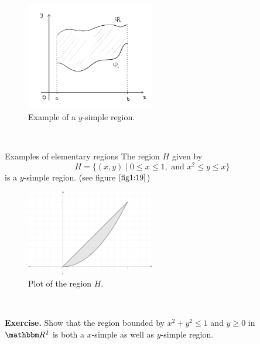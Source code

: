 \documentclass[Analysis-3.tex]{subfiles}
\begin{document}
\begin{figure}[H]
    \centering
    \includegraphics[width=0.5\textwidth]{figures/ysimpleRegion.png}
    \caption{Example of a $y$-simple region.}
\end{figure}

\

\begin{Eg}{Examples of elementary regions}{}
    The region $H$ given by
    \[
        H = \{ (x,y) \mid 0 \leq x \leq 1, \mbox{ and } x^2 \leq y \leq x \}
    \]
    is a $y$-simple region. (see figure $\ref{fig1:19}$)
    \begin{figure}[H]
        \centering
        \includegraphics[width=0.5\textwidth]{figures/simpleRegion.png}
        \caption{Plot of the region $H$.}
        \label{fig1:19}
    \end{figure}
\end{Eg}
\

\textbf{Exercise.} Show that the region bounded by $x^2 + y^2 \leq 1$ and $y \geq 0$ in $\R^2$ is both a $x$-simple as well as $y$-simple region.
\end{document}
